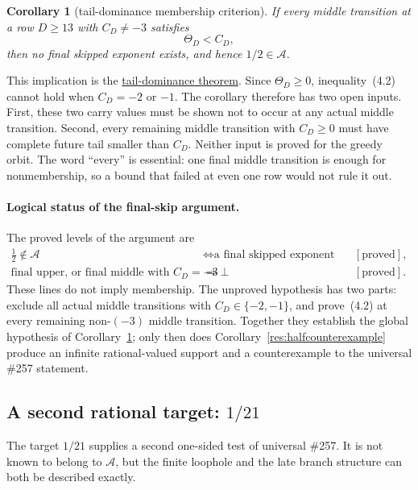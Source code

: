 \documentclass[11pt]{article}
\newcommand{\commit}{99f4bf47422abbd8757cbb22b50ba079d764d3a7}
\newcommand{\repobase}{https://github.com/wcook04/plectis-erdos/blob/\commit}
\newcommand{\PK}{Erdos249257}
\newcommand{\lword}[4]{\href{\repobase/\PK/#1\#L#2}{#4}}
\newtheorem{corollary}[theorem]{Corollary}
\theoremstyle{definition}
\theoremstyle{remark}
\begin{document}
\begin{corollary}[tail-dominance membership criterion]\label{res:taildominance}
If every middle transition at a row \(D\geq13\) with \(C_D\neq-3\) satisfies
\[
 \Theta_D<C_D, \tag{4.2}
\]
then no final skipped exponent exists, and hence \(1/2\in\mathcal A\).
\end{corollary}
\noindent This implication is the
\lword{HalfCylinderLastProducerContradiction.lean}{436}{half_mem_mersenneAchievementSet_of_middleProducerTailEscapeExceptNegThree}{tail-dominance theorem}.
Since \(\Theta_D\geq0\), inequality~\textup{(4.2)} cannot hold when
\(C_D=-2\) or \(-1\).  The corollary therefore has two open inputs.  First,
these two carry values must be shown not to occur at any actual middle
transition.  Second, every remaining middle transition with \(C_D\geq0\)
must have complete future tail smaller than \(C_D\).  Neither input is proved
for the greedy orbit.  The word ``every'' is essential: one final middle
transition is enough for nonmembership, so a bound that failed at even one
row would not rule it out.

\paragraph{Logical status of the final-skip argument.}
The proved levels of the argument are
{\small\setlength{\arraycolsep}{3pt}
\[
\begin{array}{rcl}
 \frac12\notin\mathcal A
 &\Leftrightarrow
   \text{a final skipped exponent exists}
 &[\text{proved}],\\
 \text{final upper, or final middle with }C_D=-3
 &\Rightarrow\bot
 &[\text{proved}].
\end{array}
\]
}
These lines do not imply membership.  The unproved hypothesis has two parts:
exclude all actual middle transitions with \(C_D\in\{-2,-1\}\), and
prove~\textup{(4.2)} at every remaining non-\((-3)\) middle transition.
Together they establish the global hypothesis of
Corollary~\ref{res:taildominance}; only then does
Corollary~\ref{res:halfcounterexample} produce an infinite rational-valued
support and a counterexample to the universal \#257 statement.

\subsection{A second rational target: \(1/21\)}
\label{sec:twenty-one-frontier}

The target \(1/21\) supplies a second one-sided test of universal \#257.
It is not known to belong to \(\mathcal A\), but the finite loophole and the
late branch structure can both be described exactly.
\end{document}
